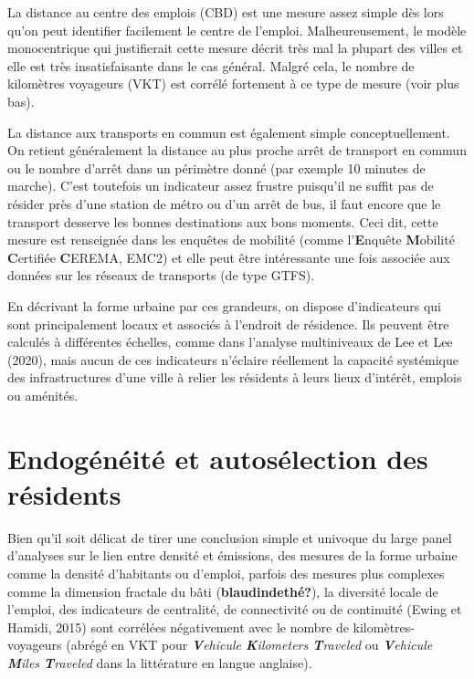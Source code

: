 \documentclass[
  9pt,
  a4paper,
  DIV=11]{scrreprt}
\begin{document}
La distance au centre des emplois (CBD) est une mesure assez simple dès
lors qu'on peut identifier facilement le centre de l'emploi.
Malheureusement, le modèle monocentrique qui justifierait cette mesure
décrit très mal la plupart des villes et elle est très insatisfaisante
dans le cas général. Malgré cela, le nombre de kilomètres voyageurs
(VKT) est corrélé fortement à ce type de mesure (voir plus bas).

La distance aux transports en commun est également simple
conceptuellement. On retient généralement la distance au plus proche
arrêt de transport en commun ou le nombre d'arrêt dans un périmètre
donné (par exemple 10 minutes de marche). C'est toutefois un indicateur
assez frustre puisqu'il ne suffit pas de résider près d'une station de
métro ou d'un arrêt de bus, il faut encore que le transport desserve les
bonnes destinations aux bons moments. Ceci dit, cette mesure est
renseignée dans les enquêtes de mobilité (comme l'\textbf{E}nquête
\textbf{M}obilité \textbf{C}ertifiée \textbf{C}EREMA, EMC2) et elle peut
être intéressante une fois associée aux données sur les réseaux de
transports (de type GTFS).

En décrivant la forme urbaine par ces grandeurs, on dispose
d'indicateurs qui sont principalement locaux et associés à l'endroit de
résidence. Ils peuvent être calculés à différentes échelles, comme dans
l'analyse multiniveaux de Lee et Lee (2020), mais aucun de ces
indicateurs n'éclaire réellement la capacité systémique des
infrastructures d'une ville à relier les résidents à leurs lieux
d'intérêt, emplois ou aménités.

\section{Endogénéité et autosélection des
résidents}\label{endoguxe9nuxe9ituxe9-et-autosuxe9lection-des-ruxe9sidents}

Bien qu'il soit délicat de tirer une conclusion simple et univoque du
large panel d'analyses sur le lien entre densité et émissions, des
mesures de la forme urbaine comme la densité d'habitants ou d'emploi,
parfois des mesures plus complexes comme la dimension fractale du bâti
(\textbf{blaudindethé?}), la diversité locale de l'emploi, des
indicateurs de centralité, de connectivité ou de continuité (Ewing et
Hamidi, 2015) sont corrélées négativement avec le nombre de
kilomètres-voyageurs (abrégé en VKT pour \emph{\textbf{V}ehicule
\textbf{K}ilometers \textbf{T}raveled} ou \emph{\textbf{V}ehicule
\textbf{M}iles \textbf{T}raveled} dans la littérature en langue
anglaise).
\end{document}
